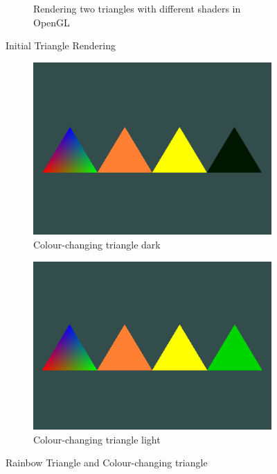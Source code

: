 \documentclass[a4paper, 12pt]{article}
\begin{document}
\begin{figure}[H]
\begin{subfigure}[b]{0.45\textwidth}
            \caption{Rendering two triangles with different shaders in OpenGL}
        \end{subfigure}
        \caption{Initial Triangle Rendering}
    \end{figure}

    \begin{figure}[H]
        \centering
        \begin{subfigure}[b]{0.45\textwidth}
            \centering
            \includegraphics[width=\textwidth]{openGL4TrianglesDark.png}
            \caption{Colour-changing triangle dark}
        \end{subfigure}
        \hfill
        \begin{subfigure}[b]{0.45\textwidth}
            \centering
            \includegraphics[width=\textwidth]{openGL4TrianglesLight.png}
            \caption{Colour-changing triangle light}
        \end{subfigure}
        \caption{Rainbow Triangle and Colour-changing triangle}
    \end{figure}
\end{document}
